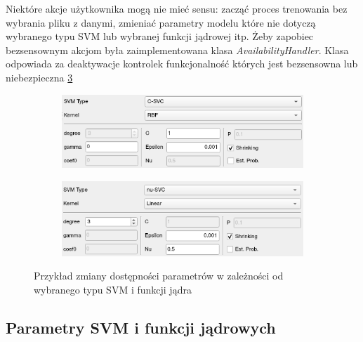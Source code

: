\documentclass[paper=a4, fontsize=11pt]{scrartcl} %
\numberwithin{equation}{section} %
\numberwithin{figure}{section} %
\begin{document}
    \par Niektóre akcje użytkownika mogą nie mieć sensu: zacząć proces trenowania bez wybrania
    pliku z danymi, zmieniać parametry modelu które nie dotyczą wybranego typu SVM lub
    wybranej funkcji jądrowej itp. Żeby zapobiec bezsensownym akcjom była zaimplementowana
    klasa \textit{AvailabilityHandler}. Klasa odpowiada za deaktywacje kontrolek funkcjonalność
    których jest bezsensowna lub niebezpieczna \ref{fig:availability_ex} 


    \begin{figure}[H]
        \begin{subfigure}{.5\textwidth}
            \centering
            \includegraphics[width=.95\linewidth]{img/svm_app_param_ex1.png}
            \label{fig:availability_ex1}
        \end{subfigure}%
        \begin{subfigure}{.5\textwidth}
            \centering
            \includegraphics[width=.95\linewidth]{img/svm_app_param_ex2.png}
            \label{fig:availability_ex2}
        \end{subfigure}
        \caption{Przykład zmiany dostępności parametrów w zależności od wybranego typu SVM i
        funkcji jądra}
        \label{fig:availability_ex}
    \end{figure}



\subsection{Parametry SVM i funkcji jądrowych}
\end{document}
